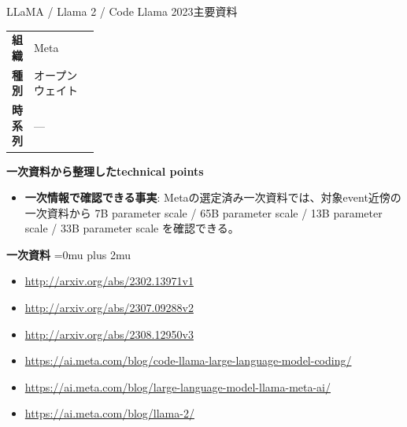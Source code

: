 \begin{technicalnote}{LLaMA / Llama 2 / Code Llama 2023}{主要資料}
\begingroup
\begin{tabularx}{\linewidth}{@{}>{\bfseries}p{0.22\linewidth}X@{}}
組織 & Meta \\
種別 & オープンウェイト \\
時系列 & — \\
\end{tabularx}
\smallskip
{\bfseries 一次資料から整理したtechnical points}
\begin{itemize}[leftmargin=1.5em,itemsep=0.35em]
\item \textbf{一次情報で確認できる事実}: Metaの選定済み一次資料では、対象event近傍の一次資料から 7B parameter scale / 65B parameter scale / 13B parameter scale / 33B parameter scale を確認できる。
\end{itemize}
\begin{minipage}{\linewidth}
\begin{samepage}
{\bfseries 一次資料}
\begingroup\sloppy
\Urlmuskip=0mu plus 2mu\relax
\begin{itemize}[leftmargin=1.5em,itemsep=0.25em]
\item {\scriptsize\url{http://arxiv.org/abs/2302.13971v1}}
\item {\scriptsize\url{http://arxiv.org/abs/2307.09288v2}}
\item {\scriptsize\url{http://arxiv.org/abs/2308.12950v3}}
\item {\scriptsize\url{https://ai.meta.com/blog/code-llama-large-language-model-coding/}}
\item {\scriptsize\url{https://ai.meta.com/blog/large-language-model-llama-meta-ai/}}
\item {\scriptsize\url{https://ai.meta.com/blog/llama-2/}}
\end{itemize}
\endgroup
\end{samepage}
\end{minipage}
\endgroup
\end{technicalnote}
\medskip

